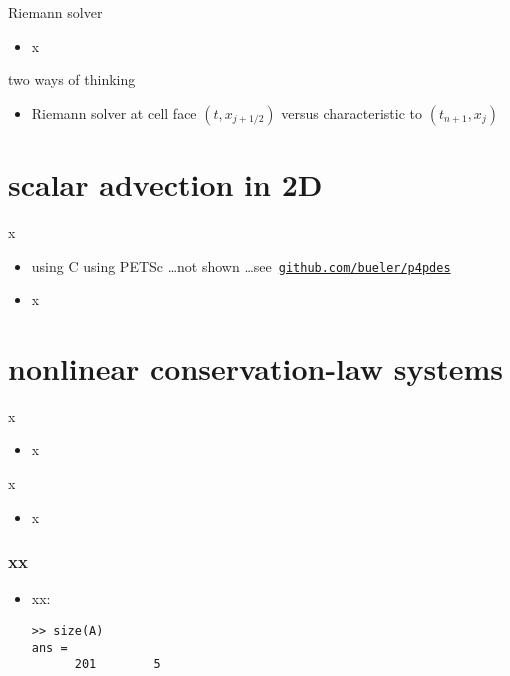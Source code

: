\documentclass[10pt,hyperref]{beamer}
\begin{document}
\begin{frame}{Riemann solver}

\begin{itemize}
\item x
\end{itemize}
\end{frame}


\begin{frame}{two ways of thinking}

\begin{itemize}
\item Riemann solver at cell face $(t,x_{j+1/2})$ versus characteristic to $(t_{n+1},x_j)$
\end{itemize}
\end{frame}

\section{scalar advection in 2D}

\begin{frame}{x}

\begin{itemize}
\item using C using PETSc \dots not shown \dots see \,\href{https://github.com/bueler/p4pdes}{\texttt{github.com/bueler/p4pdes}}
\item x
\end{itemize}
\end{frame}


\section{nonlinear conservation-law systems}

\begin{frame}{x}

\begin{itemize}
\item x
\end{itemize}
\end{frame}


\begin{frame}{x}

\begin{itemize}
\item x
\end{itemize}
\end{frame}


\begin{frame}[fragile]
\frametitle{xx}

\begin{itemize}
\item xx:

\medskip
\begin{Verbatim}[fontsize=\scriptsize]
>> size(A)
ans =
      201        5
\end{Verbatim}

\end{itemize}
\end{frame}
\end{document}
